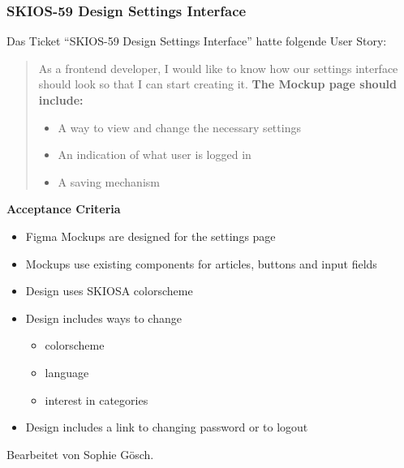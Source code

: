\subsubsection{SKIOS-59 Design Settings Interface}
Das Ticket \enquote{SKIOS-59 Design Settings Interface} hatte folgende User Story:
\begin{quotation}
    As a frontend developer, I would like to know how our settings interface should look so that I can start creating it.
    \textbf{The Mockup page should include:}
        \begin{itemize}
            \item A way to view and change the necessary settings
            \item An indication of what user is logged in
            \item A saving mechanism
        \end{itemize}
\end{quotation}
\textbf{Acceptance Criteria}
    \begin{itemize}
        \item Figma Mockups are designed for the settings page
        \item Mockups use existing components for articles, buttons and input fields
        \item Design uses SKIOSA colorscheme
        \item Design includes ways to change
        \begin{itemize}
            \item colorscheme
            \item language
            \item interest in categories
        \end{itemize}
        \item Design includes a link to changing password or to logout 
    \end{itemize}
Bearbeitet von Sophie Gösch.


